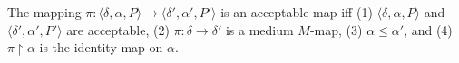 The mapping $\pi: \langle \delta, \alpha, P \rangle \rightarrow \langle \delta', \alpha', P' \rangle$ is an acceptable map iff
(1) $\langle \delta, \alpha, P \rangle$ and $\langle \delta', \alpha', P' \rangle$ are acceptable,
(2) $\pi: \delta \rightarrow \delta'$ is a medium $M$-map,
(3) $\alpha \leq \alpha'$, and
(4) $\pi \upharpoonright \alpha$ is the identity map on $\alpha$.
